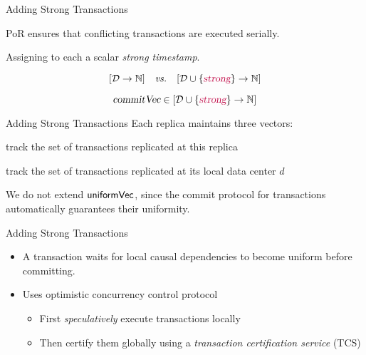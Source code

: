 
\begin{frame}{Adding Strong Transactions}
  \begin{center}
    PoR ensures that conflicting transactions are executed serially.

    \pause
    \vspace{0.50cm}
    Assigning to each  a scalar \emph{strong timestamp}.
  \end{center}

  \pause
  \vspace{0.30cm}
  \[
    [\mathcal{D} \to \mathbb{N}] \quad\text{\emph{vs.}}\quad [\mathcal{D} \cup \{\textcolor{purple}{\textsl{strong}}\} \to \mathbb{N}]
  \]

  \pause
  \[
    \textsl{commitVec} \in [\mathcal{D} \cup \{\textcolor{purple}{\textsl{strong}}\} \to \mathbb{N}]
  \]
\end{frame}

\begin{frame}{Adding Strong Transactions}
  Each replica maintains three vectors: \\[5pt]

  \begin{description}[<+->]
    \setlength{\itemsep}{10pt}
    \item[$\knownVC\text{[\strongcolor{\strongentry}]}$:] track the set of  transactions replicated at this replica
    \item[$\stableVC\text{[\strongcolor{\strongentry}]}$:] track the set of  transactions replicated at its local data center $d$
  \end{description}

  \pause
  \vspace{0.50cm}
  We do not extend ${\sf uniformVec}$, since the commit protocol for
   transactions automatically guarantees their uniformity.
\end{frame}

\begin{frame}{Adding Strong Transactions}
  \begin{itemize}[<+->]
    \setlength{\itemsep}{8pt}
    \item A  transaction waits for local causal dependencies to
          become uniform before committing.
    \item Uses optimistic concurrency control protocol \\[6pt]
          \begin{itemize}
            \setlength{\itemsep}{6pt}
            \item First \emph{speculatively} execute  transactions locally
            \item Then certify them globally using a \emph{transaction certification service}
                  (TCS)
          \end{itemize}
  \end{itemize}
\end{frame}

